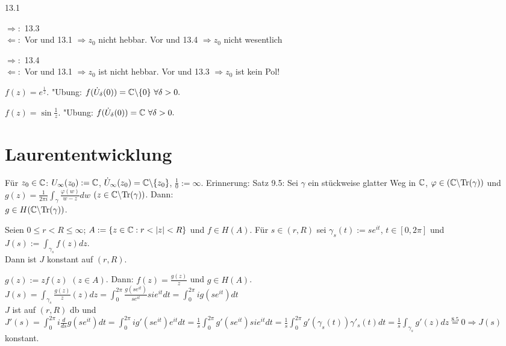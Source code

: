\documentclass[a4paper,twoside,DIV15,BCOR12mm]{scrbook}
\begin{document}
\begin{beweis}
\begin{liste}
\item 13.1
\item $\Rightarrow:$ 13.3\\
$\Leftarrow:$ Vor und 13.1 $\Rightarrow z_0$ nicht hebbar. Vor und 13.4 $\Rightarrow z_0$ nicht wesentlich
\item $\Rightarrow:$ 13.4\\
$\Leftarrow:$ Vor und 13.1 $\Rightarrow z_0$ ist nicht hebbar. Vor und 13.3 $\Rightarrow z_0$ ist kein Pol!
\end{liste}
\end{beweis}

\begin{beispiele}
\begin{liste}
\item $f(z) = e^{\frac1z}.$ "Ubung: $f(\dot{U}_{\delta}(0)) = \mathbb{C} \backslash \{0\} \ \forall \delta > 0.$
\item $f(z) = \sin \frac1z$. "Ubung: $f(\dot{U}_{\delta}(0)) = \MdC \ \forall \delta > 0.$
\end{liste}
\end{beispiele}

\chapter{Laurententwicklung}

Für $z_0 \in \mathbb{C}$: $U_\infty(z_0) := \mathbb{C}$, $\dot{U}_\infty(z_0) = \mathbb{C} \backslash \{z_0\}$, 
$\frac{1}{0} := \infty$. Erinnerung: Satz 9.5: Sei $\gamma$ ein stückweise glatter Weg in $\mathbb{C}$, 
$\varphi \in (\mathbb{C} \backslash \text{Tr}(\gamma))$ und $g(z) = \frac{1}{2 \pi i}\int_{\gamma}\frac{\varphi(w)}{w-z}dw$ 
$(z \in  \mathbb{C} \backslash \text{Tr}(\gamma) )$. Dann: \\
$g \in H( \mathbb{C} \backslash \text{Tr}(\gamma))$.

\begin{satz}
  Seien $ 0 \le r < R \le \infty$; $A := \{ z \in \mathbb{C} : r < |z| < R \}$ und $f \in H(A)$. Für $s \in (r,R)$ sei 
  $\gamma_s(t) := se^{it}$, $t \in [0,2 \pi ]$ und $J(s) := \int_{\gamma_s} f(z) dz$. \\
  Dann ist $J$ konstant auf $(r, R)$.
\end{satz}

\begin{beweis} 
  $g(z) := z f(z)$  $(z \in A)$. Dann: 
  $f(z) = \frac{g(z)}{z}$ und $g \in H(A)$. \\
  $J(s) = \int_{\gamma_s} \frac{g(z)}{z}(z) dz = \int_0^{2 \pi} \frac{g(se^{it})}{se^{it}}sie^{it} dt =  
  \int_0^{2 \pi} ig(se^{it}) dt$\\
  $J$ ist auf $(r,R)$ db und $J'(s) = \int_0^{2 \pi} i \frac{d}{ds}g(se^{it}) dt = \int_0^{2 \pi} i g'(se^{it})e^{it}  dt = 
  \frac{1}{s} \int_0^{2 \pi} g'(se^{it})sie^{it}  dt =  \frac{1}{s} \int_0^{2 \pi} g'(\gamma_s(t))\gamma'_s(t) dt =
  \frac{1}{s} \int_{\gamma_s} g'(z) dz \stackrel{8.5}{=} 0 \Rightarrow J(s)$ konstant.
\end{beweis}
\end{document}
